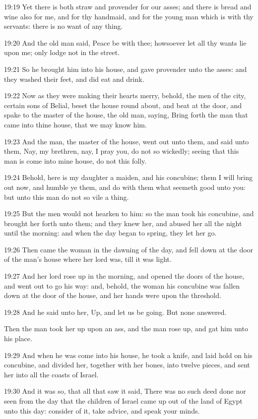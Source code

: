 19:19 Yet there is both straw and provender for our asses; and there
is bread and wine also for me, and for thy handmaid, and for the young
man which is with thy servants: there is no want of any thing.

19:20 And the old man said, Peace be with thee; howsoever let all thy
wants lie upon me; only lodge not in the street.

19:21 So he brought him into his house, and gave provender unto the
asses: and they washed their feet, and did eat and drink.

19:22 Now as they were making their hearts merry, behold, the men of
the city, certain sons of Belial, beset the house round about, and
beat at the door, and spake to the master of the house, the old man,
saying, Bring forth the man that came into thine house, that we may
know him.

19:23 And the man, the master of the house, went out unto them, and
said unto them, Nay, my brethren, nay, I pray you, do not so wickedly;
seeing that this man is come into mine house, do not this folly.

19:24 Behold, here is my daughter a maiden, and his concubine; them I
will bring out now, and humble ye them, and do with them what seemeth
good unto you: but unto this man do not so vile a thing.

19:25 But the men would not hearken to him: so the man took his
concubine, and brought her forth unto them; and they knew her, and
abused her all the night until the morning: and when the day began to
spring, they let her go.

19:26 Then came the woman in the dawning of the day, and fell down at
the door of the man's house where her lord was, till it was light.

19:27 And her lord rose up in the morning, and opened the doors of the
house, and went out to go his way: and, behold, the woman his
concubine was fallen down at the door of the house, and her hands were
upon the threshold.

19:28 And he said unto her, Up, and let us be going. But none
answered.

Then the man took her up upon an ass, and the man rose up, and gat him
unto his place.

19:29 And when he was come into his house, he took a knife, and laid
hold on his concubine, and divided her, together with her bones, into
twelve pieces, and sent her into all the coasts of Israel.

19:30 And it was so, that all that saw it said, There was no such deed
done nor seen from the day that the children of Israel came up out of
the land of Egypt unto this day: consider of it, take advice, and
speak your minds.

